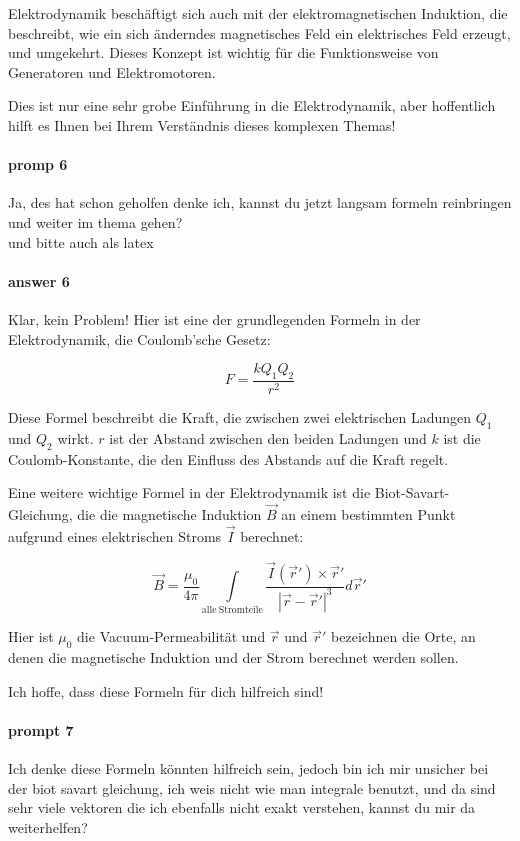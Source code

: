 \documentclass{article}
\begin{document}
Elektrodynamik beschäftigt sich auch mit der elektromagnetischen Induktion, die
beschreibt, wie ein sich änderndes magnetisches Feld ein elektrisches Feld
erzeugt, und umgekehrt. Dieses Konzept ist wichtig für die Funktionsweise von
Generatoren und Elektromotoren.

Dies ist nur eine sehr grobe Einführung in die Elektrodynamik, aber hoffentlich
hilft es Ihnen bei Ihrem Verständnis dieses komplexen Themas!

\paragraph{promp 6} %
\label{par:promp 6}
Ja, des hat schon geholfen denke ich, kannst du jetzt langsam formeln reinbringen und weiter im thema gehen?\\
und bitte auch als latex

\paragraph{answer 6} %
\label{par:answer 6}
Klar, kein Problem! Hier ist eine der grundlegenden Formeln in der
Elektrodynamik, die Coulomb'sche Gesetz:

$$F = \frac{kQ_1Q_2}{r^2}$$

Diese Formel beschreibt die Kraft, die zwischen zwei elektrischen Ladungen
$Q_1$ und $Q_2$ wirkt. $r$ ist der Abstand zwischen den beiden Ladungen und $k$
ist die Coulomb-Konstante, die den Einfluss des Abstands auf die Kraft regelt.

Eine weitere wichtige Formel in der Elektrodynamik ist die
Biot-Savart-Gleichung, die die magnetische Induktion $\vec{B}$ an einem
bestimmten Punkt aufgrund eines elektrischen Stroms $\vec{I}$ berechnet:

$$\vec{B} = \frac{\mu_0}{4\pi} \int\limits_{\mathrm{alle~Stromteile}} \frac{\vec{I}(\vec{r}') \times \vec{r}'}{|\vec{r}-\vec{r}'|^3} d\vec{r}'$$

Hier ist $\mu_0$ die Vacuum-Permeabilität und $\vec{r}$ und $\vec{r}'$
bezeichnen die Orte, an denen die magnetische Induktion und der Strom berechnet
werden sollen.

Ich hoffe, dass diese Formeln für dich hilfreich sind!

\paragraph{prompt 7} %
\label{par:prompt 7}
Ich denke diese Formeln könnten hilfreich sein, jedoch bin ich mir unsicher bei
der biot savart gleichung, ich weis nicht wie man integrale benutzt, und da
sind sehr viele vektoren die ich ebenfalls nicht exakt verstehen, kannst du mir
da weiterhelfen?
\end{document}
